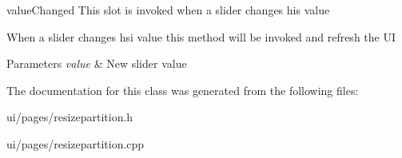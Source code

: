 value\+Changed This slot is invoked when a slider changes his value 

When a slider changes hsi value this method will be invoked and refresh the UI 
\begin{DoxyParams}{Parameters}
{\em value} & New slider value \\
\hline
\end{DoxyParams}


The documentation for this class was generated from the following files\+:\begin{DoxyCompactItemize}
\item 
ui/pages/resizepartition.\+h\item 
ui/pages/resizepartition.\+cpp\end{DoxyCompactItemize}
